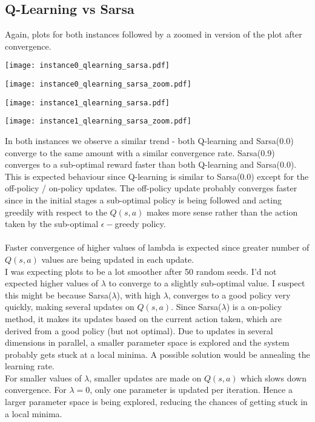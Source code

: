 \documentclass[11pt]{article}
\begin{document}
\subsection{Q-Learning vs Sarsa}
Again, plots for both instances followed by a zoomed in version of the plot after convergence.
\begin{center}
\texttt{[image: instance0\_qlearning\_sarsa.pdf]}
\end{center}
\begin{center}
\texttt{[image: instance0\_qlearning\_sarsa\_zoom.pdf]}
\end{center}
\begin{center}
\texttt{[image: instance1\_qlearning\_sarsa.pdf]}
\end{center}
\begin{center}
\texttt{[image: instance1\_qlearning\_sarsa\_zoom.pdf]}
\end{center}
In both instances we observe a similar trend - both Q-learning and Sarsa(0.0) converge to the same amount with a similar convergence rate. Sarsa(0.9) converges to a sub-optimal reward faster than both Q-learning and Sarsa(0.0).\\
This is expected behaviour since Q-learning is similar to Sarsa(0.0) except for the off-policy / on-policy updates. The off-policy update probably converges faster since in the initial stages a sub-optimal policy is being followed and acting greedily with respect to the $Q(s,a)$ makes more sense rather than the action taken by the sub-optimal $\epsilon-$greedy policy.\\\\
Faster convergence of higher values of lambda is expected since greater number of $Q(s,a)$ values are being updated in each update.\\
I was expecting plots to be a lot smoother after 50 random seeds. I'd not expected higher values of $\lambda$ to converge to a slightly sub-optimal value. I suspect this might be because Sarsa($\lambda$), with high $\lambda$, converges to a good policy very quickly, making several updates on $Q(s,a)$. Since Sarsa($\lambda$) is a on-policy method, it makes its updates based on the current action taken, which are derived from a good policy (but not optimal). Due to updates in several dimensions in parallel, a smaller parameter space is explored and the system probably gets stuck at a local minima. A possible solution would be annealing the learning rate.\\
For smaller values of $\lambda$, smaller updates are made on $Q(s,a)$ which slows down convergence. For $\lambda = 0$, only one parameter is updated per iteration. Hence a larger parameter space is being explored, reducing the chances of getting stuck in a local minima.
\end{document}
